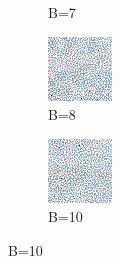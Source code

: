 \begin{figure}[H]
\begin{subfigure}[b]{0.2\linewidth}
         \caption{B=7}
         \label{pic:screen_B7}
    \end{subfigure}
    \begin{subfigure}[b]{0.2\linewidth}
        \includegraphics[width=\linewidth]{content/TemporalerAlg/Bilder/Sorting/DiffDimensions/8/seed_debug_5.0_small_screen.png}
         \caption{B=8}
         \label{pic:screen_B8}
    \end{subfigure}
    \begin{subfigure}[b]{0.2\linewidth}
        \includegraphics[width=\linewidth]{content/TemporalerAlg/Bilder/Sorting/DiffDimensions/10/seed_debug_5.0_small_screen.png}
         \caption{B=10}
         \label{pic:screen_B10}
    \end{subfigure}


\end{figure}
